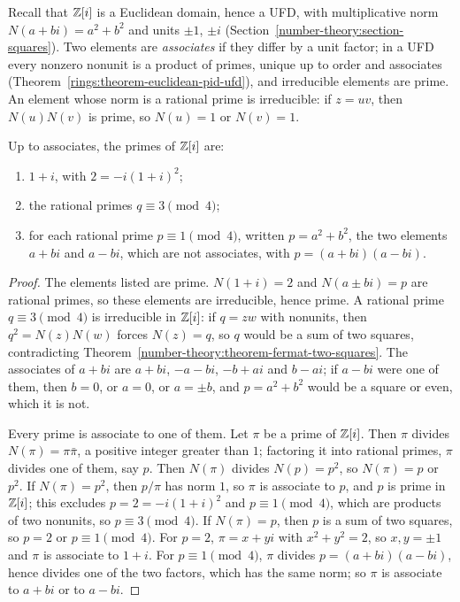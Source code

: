 Recall that $\mathbb{Z}[i]$ is a Euclidean domain, hence a UFD, with multiplicative norm $N(a + bi) = a^2 + b^2$ and units $\pm1$, $\pm i$ (Section~\ref{number-theory:section-squares}). Two elements are
\emph{associates} if they differ by a unit factor; in a UFD every nonzero nonunit is a product of primes, unique up to order and associates (Theorem~\ref{rings:theorem-euclidean-pid-ufd}), and
irreducible elements are prime. An element whose norm is a rational prime is irreducible: if $z = uv$, then $N(u)N(v)$ is prime, so $N(u) = 1$ or $N(v) = 1$.

\begin{theorem}\label{number-theory:theorem-gaussian-primes}
Up to associates, the primes of $\mathbb{Z}[i]$ are:
\begin{enumerate}
\item $1 + i$, with $2 = -i(1 + i)^2$;
\item the rational primes $q \equiv 3 \pmod 4$;
\item for each rational prime $p \equiv 1 \pmod 4$, written $p = a^2 + b^2$, the two elements $a + bi$ and $a - bi$, which are not associates, with $p = (a + bi)(a - bi)$.
\end{enumerate}
\end{theorem}

\begin{proof}
The elements listed are prime. $N(1 + i) = 2$ and $N(a \pm bi) = p$ are rational primes, so these elements are irreducible, hence prime. A rational prime $q \equiv 3 \pmod 4$ is irreducible in $\mathbb{Z}[i]$: if
$q = zw$ with nonunits, then $q^2 = N(z)N(w)$ forces $N(z) = q$, so $q$ would be a sum of two squares, contradicting Theorem~\ref{number-theory:theorem-fermat-two-squares}. The associates of $a + bi$ are
$a + bi$, $-a - bi$, $-b + ai$ and $b - ai$; if $a - bi$ were one of them, then $b = 0$, or $a = 0$, or $a = \pm b$, and $p = a^2 + b^2$ would be a square or even, which it is not.

Every prime is associate to one of them. Let $\pi$ be a prime of $\mathbb{Z}[i]$. Then $\pi$ divides $N(\pi) = \pi\bar\pi$, a positive integer greater than $1$; factoring it into rational primes, $\pi$ divides
one of them, say $p$. Then $N(\pi)$ divides $N(p) = p^2$, so $N(\pi) = p$ or $p^2$. If $N(\pi) = p^2$, then $p/\pi$ has norm $1$, so $\pi$ is associate to $p$, and $p$ is prime in $\mathbb{Z}[i]$; this excludes
$p = 2 = -i(1 + i)^2$ and $p \equiv 1 \pmod 4$, which are products of two nonunits, so $p \equiv 3 \pmod 4$. If $N(\pi) = p$, then $p$ is a sum of two squares, so $p = 2$ or $p \equiv 1 \pmod 4$. For
$p = 2$, $\pi = x + yi$ with $x^2 + y^2 = 2$, so $x, y = \pm1$ and $\pi$ is associate to $1 + i$. For $p \equiv 1 \pmod 4$, $\pi$ divides $p = (a + bi)(a - bi)$, hence divides one of the two factors, which
has the same norm; so $\pi$ is associate to $a + bi$ or to $a - bi$.
\end{proof}

